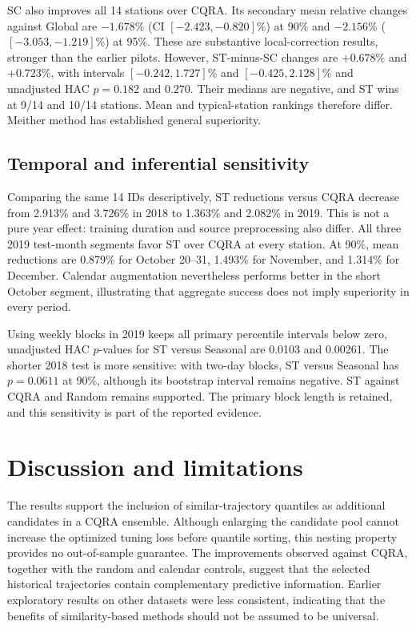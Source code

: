 \documentclass[11pt]{article}
\begin{document}
SC also improves all 14 stations over CQRA. Its secondary mean relative changes against Global are $-1.678\%$ (CI $[-2.423,-0.820]\%$) at 90\% and $-2.156\%$ ($[-3.053,-1.219]\%$) at 95\%. These are substantive local-correction results, stronger than the earlier pilots. However, ST-minus-SC changes are $+0.678\%$ and $+0.723\%$, with intervals $[-0.242,1.727]\%$ and $[-0.425,2.128]\%$ and unadjusted HAC $p=0.182$ and $0.270$. Their medians are negative, and ST wins at 9/14 and 10/14 stations. Mean and typical-station rankings therefore differ. Meither method has established general superiority.

\subsection{Temporal and inferential sensitivity}
Comparing the same 14 IDs descriptively, ST reductions versus CQRA decrease from 2.913\% and 3.726\% in 2018 to 1.363\% and 2.082\% in 2019. This is not a pure year effect: training duration and source preprocessing also differ. All three 2019 test-month segments favor ST over CQRA at every station. At 90\%, mean reductions are 0.879\% for October 20--31, 1.493\% for November, and 1.314\% for December. Calendar augmentation nevertheless performs better in the short October segment, illustrating that aggregate success does not imply superiority in every period.

Using weekly blocks in 2019 keeps all primary percentile intervals below zero, unadjusted HAC $p$-values for ST versus Seasonal are 0.0103 and 0.00261. The shorter 2018 test is more sensitive: with two-day blocks, ST versus Seasonal has $p=0.0611$ at 90\%, although its bootstrap interval remains negative. ST against CQRA and Random remains supported. The primary block length is retained, and this sensitivity is part of the reported evidence.

 
\section{Discussion and limitations}

The results support the inclusion of similar-trajectory quantiles
as additional candidates in a CQRA ensemble. Although enlarging
the candidate pool cannot increase the optimized tuning loss
before quantile sorting, this nesting property provides no
out-of-sample guarantee. The improvements observed against
CQRA, together with the random and calendar controls, suggest
that the selected historical trajectories contain complementary
predictive information. Earlier exploratory results on other
datasets were less consistent, indicating that the benefits
of similarity-based methods should not be assumed to be universal.
\end{document}
